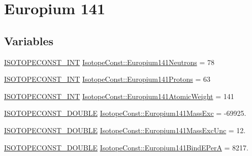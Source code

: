 \hypertarget{group___isotope_const-_europium-_eu141}{}\section{Europium 141}
\label{group___isotope_const-_europium-_eu141}
\subsection*{Variables}
\begin{DoxyCompactItemize}
\item 
\mbox{\hyperlink{group___isotope_const-_macros_ga5f18360b3e99483a35c32d789e62621c}{I\+S\+O\+T\+O\+P\+E\+C\+O\+N\+S\+T\+\_\+\+I\+NT}} \mbox{\hyperlink{group___isotope_const-_europium-_eu141_gac227daff894af55cc0bdcb0413bedde4}{Isotope\+Const\+::\+Europium141\+Neutrons}} = 78
\item 
\mbox{\hyperlink{group___isotope_const-_macros_ga5f18360b3e99483a35c32d789e62621c}{I\+S\+O\+T\+O\+P\+E\+C\+O\+N\+S\+T\+\_\+\+I\+NT}} \mbox{\hyperlink{group___isotope_const-_europium-_eu141_ga0433ce334c0a92b2ef4964b177d4e12c}{Isotope\+Const\+::\+Europium141\+Protons}} = 63
\item 
\mbox{\hyperlink{group___isotope_const-_macros_ga5f18360b3e99483a35c32d789e62621c}{I\+S\+O\+T\+O\+P\+E\+C\+O\+N\+S\+T\+\_\+\+I\+NT}} \mbox{\hyperlink{group___isotope_const-_europium-_eu141_ga4c48d781e7564b6ac93c6182ee6beaaa}{Isotope\+Const\+::\+Europium141\+Atomic\+Weight}} = 141
\item 
\mbox{\hyperlink{group___isotope_const-_macros_ga8f45a7272ce02c0b4c65c44636ed719a}{I\+S\+O\+T\+O\+P\+E\+C\+O\+N\+S\+T\+\_\+\+D\+O\+U\+B\+LE}} \mbox{\hyperlink{group___isotope_const-_europium-_eu141_ga7aa13268183b1418b784fb2eea6e7d2e}{Isotope\+Const\+::\+Europium141\+Mass\+Exc}} = -\/69925.
\item 
\mbox{\hyperlink{group___isotope_const-_macros_ga8f45a7272ce02c0b4c65c44636ed719a}{I\+S\+O\+T\+O\+P\+E\+C\+O\+N\+S\+T\+\_\+\+D\+O\+U\+B\+LE}} \mbox{\hyperlink{group___isotope_const-_europium-_eu141_ga798e8c8f68a7ee05bb7536e0fee4b234}{Isotope\+Const\+::\+Europium141\+Mass\+Exc\+Unc}} = 12.
\item 
\mbox{\hyperlink{group___isotope_const-_macros_ga8f45a7272ce02c0b4c65c44636ed719a}{I\+S\+O\+T\+O\+P\+E\+C\+O\+N\+S\+T\+\_\+\+D\+O\+U\+B\+LE}} \mbox{\hyperlink{group___isotope_const-_europium-_eu141_gaf16ed64d1ff9da82f157b37970116143}{Isotope\+Const\+::\+Europium141\+Bind\+E\+PerA}} = 8217.
\item 

\end{DoxyCompactItemize}
